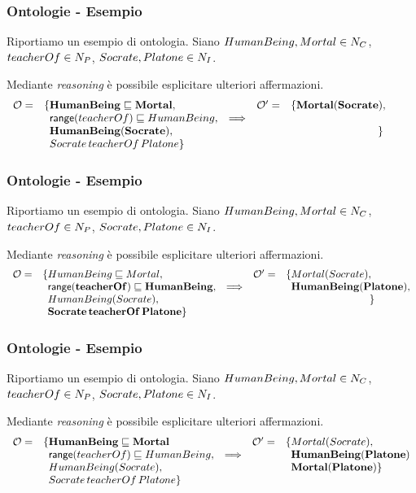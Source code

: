 \documentclass[8pt]{beamer}
\begin{document}
\begin{frame}
\frametitle{Ontologie - Esempio}
Riportiamo un esempio di ontologia. Siano $HumanBeing, Mortal \in N_C$,
$teacherOf \in N_P$, $Socrate, Platone \in N_I$.
\vspace{\baselineskip}

Mediante \emph{reasoning} \`e possibile esplicitare ulteriori 
affermazioni.
\[
 \begin{array}{clccl}
  \Ont  =  &\{\mathbf{HumanBeing \Issub Mortal}, & &\Ontp = & \{\mathbf{Mortal(Socrate)}, \\
  &\phantom{\{}\range(teacherOf) \Issub HumanBeing, & \Longrightarrow&& \phantom{\{HumanBeing(Platone)}\\
  &\phantom{\{}\mathbf{HumanBeing(Socrate)}, &&&\phantom{\{Mortal(Platone)}\}\\
  &\phantom{\{}Socrate\,teacherOf\,Platone \}\\
 \end{array}
\]
\end{frame}

\begin{frame}
\frametitle{Ontologie - Esempio}
Riportiamo un esempio di ontologia. Siano $HumanBeing, Mortal \in N_C$,
$teacherOf \in N_P$, $Socrate, Platone \in N_I$.
\vspace{\baselineskip}

Mediante \emph{reasoning} \`e possibile esplicitare ulteriori 
affermazioni.
\[
 \begin{array}{clccl}
  \Ont  =  &\{HumanBeing \Issub Mortal, & &\Ontp = & \{Mortal(Socrate), \\
  &\phantom{\{}\mathbf{\range(teacherOf) \Issub HumanBeing}, & \Longrightarrow&& \phantom{\}}\mathbf{HumanBeing(Platone)},\\
  &\phantom{\{}HumanBeing(Socrate), &&&\phantom{\{Mortal(Platone)}\}\\
  &\phantom{\{}\mathbf{Socrate\,teacherOf\,Platone} \}\\
 \end{array}
\]
\end{frame}

\begin{frame}
\frametitle{Ontologie - Esempio}
Riportiamo un esempio di ontologia. Siano $HumanBeing, Mortal \in N_C$,
$teacherOf \in N_P$, $Socrate, Platone \in N_I$.
\vspace{\baselineskip}

Mediante \emph{reasoning} \`e possibile esplicitare ulteriori 
affermazioni.
\[
 \begin{array}{clccl}
  \Ont  =  &\{\mathbf{HumanBeing \Issub Mortal} & &\Ontp = & \{Mortal(Socrate), \\
  &\phantom{\{}\range(teacherOf) \Issub HumanBeing, & \Longrightarrow && \phantom{\{}\mathbf{HumanBeing(Platone)}\\
  &\phantom{\{}HumanBeing(Socrate), &&&\phantom{\{}\mathbf{Mortal(Platone)} \}\\
  &\phantom{\{}Socrate\,teacherOf\,Platone \}\\
 \end{array}
\]
\end{frame}
\end{document}
